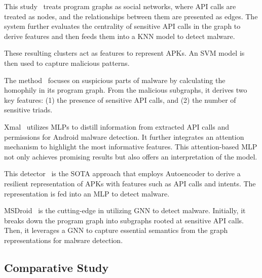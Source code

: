 This study~\cite{wu2019malscan} treats program graphs as social networks, where API calls are treated as nodes, and the relationships between them are presented as edges.
The system further evaluates the centrality of sensitive API calls in the graph to derive features and then feeds them into a KNN model to detect malware.

These resulting clusters act as features to represent APKs. 
An SVM model is then used to capture malicious patterns.

The method~\cite{wu2021homdroid} focuses on suspicious parts of malware by calculating the homophily in its program graph.
From the malicious subgraphs, it derives two key features: (1) the presence of sensitive API calls, and (2) the number of sensitive triads. 

Xmal~\cite{wu2021android} utilizes MLPs to distill information from extracted API calls and permissions for Android malware detection.
It further integrates an attention mechanism to highlight the most informative features.
This attention-based MLP not only achieves promising results but also offers an interpretation of the model.

This detector~\cite{li2021robust} is the SOTA approach that employs Autoencoder to derive a resilient representation of APKs with features such as API calls and intents.
The representation is fed into an MLP to detect malware.

MSDroid~\cite{he2022msdroid} is the cutting-edge in utilizing GNN to detect malware.
Initially, it breaks down the program graph into subgraphs rooted at sensitive API calls. 
Then, it leverages a GNN to capture essential semantics from the graph representations for malware detection.

\subsection{Comparative Study}
\label{sub:compare}

